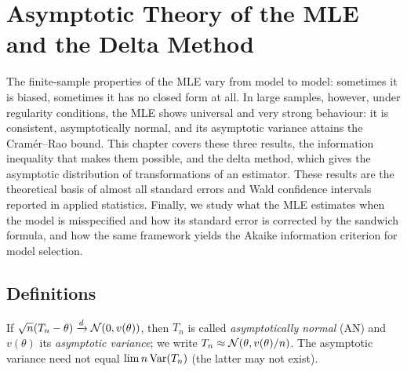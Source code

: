 \documentclass[main.tex]{subfiles}
\begin{document}
\chapter{Asymptotic Theory of the MLE and the Delta Method}\label{ch:mle-asimptotik}

The finite-sample properties of the MLE vary from model to model: sometimes it is biased, sometimes it has no closed form at all. In large samples, however, under regularity conditions, the MLE shows universal and very strong behaviour: it is consistent, asymptotically normal, and its asymptotic variance attains the Cramér--Rao bound. This chapter covers these three results, the information inequality that makes them possible, and the delta method, which gives the asymptotic distribution of transformations of an estimator. These results are the theoretical basis of almost all standard errors and Wald confidence intervals reported in applied statistics. Finally, we study what the MLE estimates when the model is misspecified and how its standard error is corrected by the sandwich formula, and how the same framework yields the Akaike information criterion for model selection.

\section{Definitions}

\begin{definition}
If $\sqrt n(T_n-\theta)\xrightarrow{d}\mathcal{N}(0,v(\theta))$, then $T_n$ is called \emph{asymptotically normal} (AN) and $v(\theta)$ its \emph{asymptotic variance}; we write $T_n\approx\mathcal{N}(\theta,v(\theta)/n)$. The asymptotic variance need not equal $\lim n\operatorname{Var}(T_n)$ (the latter may not exist).
\end{definition}
\end{document}
